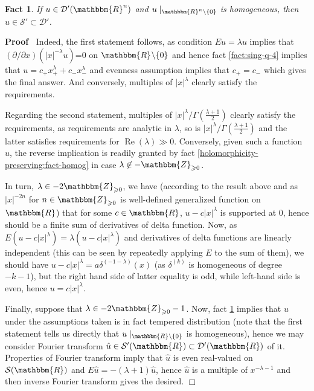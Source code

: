 \documentclass{article}
\newcommand{\nin}{\not\in}
\newcommand{\tmop}[1]{\ensuremath{\operatorname{#1}}}
\renewenvironment{proof}{\noindent\textbf{Proof\ }}{\hspace*{\fill}$\Box$\medskip}
\newtheorem{fact}[proposition]{Fact}
\theoremstyle{remark}
\begin{document}
\begin{fact}
\label{fact:homog-tempered}{\cite[thm.
7.1.18]{hormander1983analysis}} If $u \in \mathcal{D}' (\mathbbm{R}^n)$ and $u
\mid_{\mathbbm{R}^n \backslash \{ 0 \}}$ is homogeneous, then $u \in
\mathcal{S}' \subset \mathcal{D}'$.
\end{fact}

\begin{proof}
  Indeed, the first statement follows, as condition $E u = \lambda u$ implies
  that $(\partial / \partial x) (| x |^{- \lambda} u)$=0 on $\mathbbm{R}^{}
  \backslash \{ 0 \}$ and hence fact \ref{fact:sing-q-4} implies that $u = c_+
  x_+^{\lambda} + c_- x_-^{\lambda}$ and evenness assumption implies that $c_+
  = c_-$ which gives the final answer. And conversely, multiples of $| x
  |^{\lambda}$ clearly satisfy the requirements.
  
  Regarding the second statement, multiples of $| x |^{\lambda} / \Gamma
  \left( \frac{\lambda + 1}{2} \right)$ clearly satisfy the requirements, as
  requirements are analytic in $\lambda$, so is $| x |^{\lambda} / \Gamma
  \left( \frac{\lambda + 1}{2} \right)$ and the latter satisfies requirements
  for $\tmop{Re} (\lambda) \gg 0$. Conversely, given such a function $u$, the
  reverse implication is readily granted by fact
  \ref{holomorphicity-preserving:fact-homog} in case $\lambda \nin
  -\mathbbm{Z}_{\geqslant 0}$.
  
  In turn, $\lambda \in - 2\mathbbm{Z}_{\geqslant 0}$, we have (according to
  the result above and as $| x |^{- 2 n}$ for $n \in \mathbbm{Z}_{\geqslant
  0}$ is well-defined generalized function on $\mathbbm{R}$) that for some $c
  \in \mathbbm{R}$, $u - c | x |^{\lambda}$ is supported at $0$, hence should
  be a finite sum of derivatives of delta function. Now, as $E (u - c | x
  |^{\lambda}) = \lambda (u - c | x |^{\lambda})$ and derivatives of delta
  functions are linearly independent (this can be seen by repeatedly applying
  $E$ to the sum of them), we should have $u - c | x |^{\lambda} = a
  \delta^{(- 1 - \lambda)} (x)$ (as $\delta^{(k)}$ is homogeneous of degree $-
  k - 1$), but the right hand side of latter equality is odd, while left-hand
  side is even, hence $u = c | x |^{\lambda}$.
  
  Finally, suppose that $\lambda \in - 2\mathbbm{Z}_{\geqslant 0} - 1$. Now,
  fact \ref{fact:homog-tempered} implies that $u$ under the assumptions taken
  is in fact tempered distribution (note that the first statement tells us
  directly that $u \mid_{\mathbbm{R}\backslash \{ 0 \}}$ is homogeneous),
  hence we may consider Fourier transform $\hat{u} \in \mathcal{S}'
  (\mathbbm{R}) \subset \mathcal{D}' (\mathbbm{R})$ of it. Properties of
  Fourier transform imply that $\hat{u}$ is even real-valued on $\mathcal{S}
  (\mathbbm{R})$ and $E \hat{u} = - (\lambda + 1) \hat{u}$, hence $\hat{u}$ is
  a multiple of $x^{- \lambda - 1}$ and then inverse Fourier transform gives
  the desired.
\end{proof}
\end{document}

